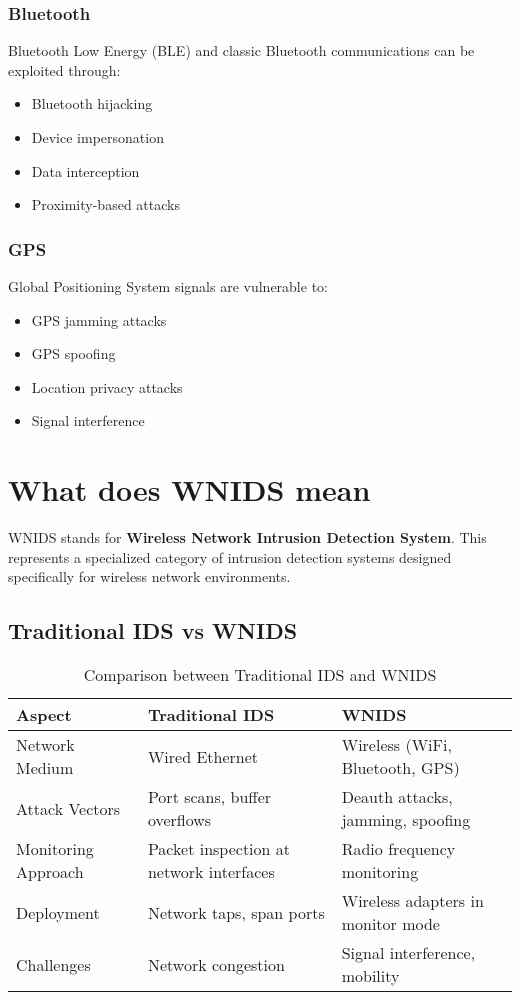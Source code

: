 \documentclass[12pt,a4paper]{report}
\begin{document}
\subsubsection{Bluetooth}
Bluetooth Low Energy (BLE) and classic Bluetooth communications can be exploited through:
\begin{itemize}
    \item Bluetooth hijacking
    \item Device impersonation
    \item Data interception
    \item Proximity-based attacks
\end{itemize}

\subsubsection{GPS}
Global Positioning System signals are vulnerable to:
\begin{itemize}
    \item GPS jamming attacks
    \item GPS spoofing
    \item Location privacy attacks
    \item Signal interference
\end{itemize}

\section{What does WNIDS mean}

WNIDS stands for \textbf{Wireless Network Intrusion Detection System}. This represents a specialized category of intrusion detection systems designed specifically for wireless network environments.

\subsection{Traditional IDS vs WNIDS}

\begin{table}[H]
\centering
\begin{tabular}{|l|p{6cm}|p{6cm}|}
\hline
\textbf{Aspect} & \textbf{Traditional IDS} & \textbf{WNIDS} \\
\hline
Network Medium & Wired Ethernet & Wireless (WiFi, Bluetooth, GPS) \\
\hline
Attack Vectors & Port scans, buffer overflows & Deauth attacks, jamming, spoofing \\
\hline
Monitoring Approach & Packet inspection at network interfaces & Radio frequency monitoring \\
\hline
Deployment & Network taps, span ports & Wireless adapters in monitor mode \\
\hline
Challenges & Network congestion & Signal interference, mobility \\
\hline
\end{tabular}
\caption{Comparison between Traditional IDS and WNIDS}
\label{tab:ids_comparison}
\end{table}
\end{document}
